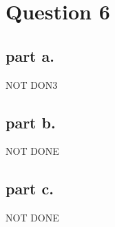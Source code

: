 \section{Question 6}

\subsection{part a.}
NOT DON3

\subsection{part b.}
NOT DONE

\subsection{part c.}
NOT DONE
